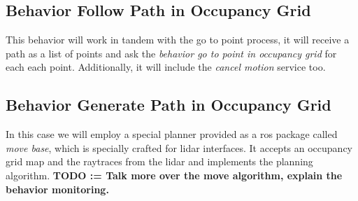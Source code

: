 \subsection{Behavior Follow Path in Occupancy Grid}

This behavior will work in tandem with the go to point process, it will receive a path as a list of points and ask the \textit{behavior go to point in occupancy grid} for each each point. Additionally, it will include the \textit{cancel motion} service too.

\subsection{Behavior Generate Path in Occupancy Grid}

In this case we will employ a special planner provided as a ros package called \textit{move base}, which is specially crafted for lidar interfaces. It accepts an occupancy grid map and the raytraces from the lidar and implements the planning algorithm. \textbf{TODO := Talk more over the move algorithm, explain the behavior monitoring.}

